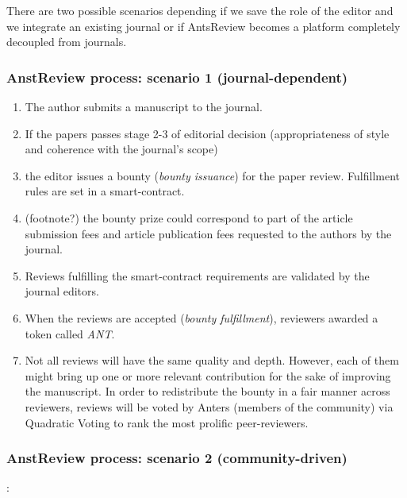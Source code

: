 \documentclass[runningheads]{llncs}
\begin{document}
There are two possible scenarios depending if we save the role of the editor and we integrate an existing journal or if AntsReview becomes a platform completely decoupled from journals.

\subsubsection{AnstReview process: scenario 1 (journal-dependent)}

\begin{enumerate}
    \item The author submits a manuscript to the journal.
    \item If the papers passes stage 2-3 of editorial decision (appropriateness of style and coherence with the journal's scope)
    \item the editor issues a bounty (\emph{bounty issuance}) for the paper review. Fulfillment rules are set in a smart-contract.
    \item (footnote?) the bounty prize could correspond to part of the article submission fees and article publication fees requested to the authors by the journal.
    \item Reviews fulfilling the smart-contract requirements are validated by the journal editors.
    \item When the reviews are accepted (\emph{bounty fulfillment}), reviewers awarded a token called \emph{ANT}.
    \item Not all reviews will have the same quality and depth. However, each of them might bring up one or more relevant contribution for the sake of improving the manuscript. In order to redistribute the bounty in a fair manner across reviewers, reviews will be voted by Anters (members of the community) via Quadratic Voting to rank the most prolific peer-reviewers.

\end{enumerate}

\subsubsection{AnstReview process: scenario 2 (community-driven)}:
\end{document}
